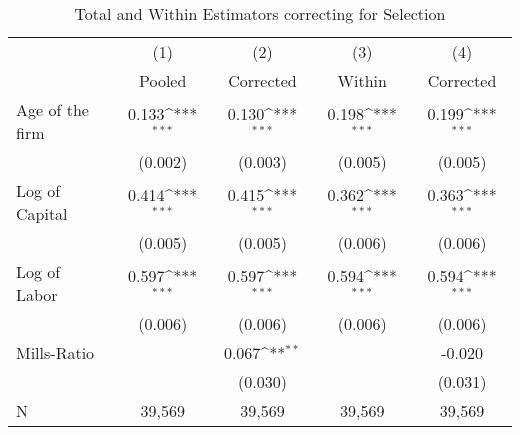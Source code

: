 \begin{table}[htbp]\centering
\def\sym#1{\ifmmode^{#1}\else\(^{#1}\)\fi}
\caption{Total and Within Estimators correcting for Selection \label{tab:q4b2}}
\begin{tabular}{l*{4}{c}}
\toprule
                    &\multicolumn{1}{c}{(1)}&\multicolumn{1}{c}{(2)}&\multicolumn{1}{c}{(3)}&\multicolumn{1}{c}{(4)}\\
                    &\multicolumn{1}{c}{Pooled}&\multicolumn{1}{c}{Corrected}&\multicolumn{1}{c}{Within}&\multicolumn{1}{c}{Corrected}\\
\midrule
Age of the firm     &       0.133\sym{***}&       0.130\sym{***}&       0.198\sym{***}&       0.199\sym{***}\\
                    &     (0.002)         &     (0.003)         &     (0.005)         &     (0.005)         \\
\addlinespace
Log of Capital      &       0.414\sym{***}&       0.415\sym{***}&       0.362\sym{***}&       0.363\sym{***}\\
                    &     (0.005)         &     (0.005)         &     (0.006)         &     (0.006)         \\
\addlinespace
Log of Labor        &       0.597\sym{***}&       0.597\sym{***}&       0.594\sym{***}&       0.594\sym{***}\\
                    &     (0.006)         &     (0.006)         &     (0.006)         &     (0.006)         \\
\addlinespace
Mills-Ratio         &                     &       0.067\sym{**} &                     &      -0.020         \\
                    &                     &     (0.030)         &                     &     (0.031)         \\
\midrule
N                   &      39,569         &      39,569         &      39,569         &      39,569         \\
\bottomrule
\end{tabular}
\end{table}

